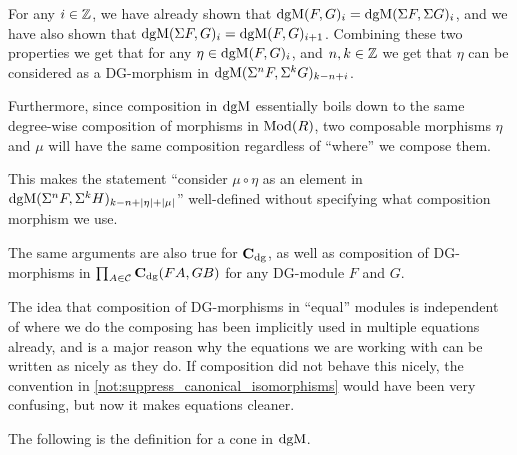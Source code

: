 \begin{remark}
    \label{rem:dgm_c_dg_super_degree_shift}
    For any \( i \in {\mathbb{Z}} \), we have already shown that \( \operatorname{dgM}(F, G)_i = \operatorname{dgM}(\Sigma F, \Sigma G)_i \), and we have also shown that \( \operatorname{dgM}(\Sigma F, G)_i = \operatorname{dgM}(F, G)_{i + 1} \). Combining these two properties we get that for any \( \eta \in \operatorname{dgM}(F, G)_i \), and \( n, k \in {\mathbb{Z}} \) we get that \( \eta \) can be considered as a DG-morphism in \( \operatorname{dgM}(\Sigma^n F, \Sigma^k G)_{k - n + i} \).

    Furthermore, since composition in \( \operatorname{dgM} \) essentially boils down to the same degree-wise composition of morphisms in \( \operatorname{Mod}(R) \), two composable morphisms \( \eta \) and \( \mu \) will have the same composition regardless of ``where'' we compose them.

    This makes the statement ``consider \( \mu \circ \eta \) as an element in \( \operatorname{dgM}(\Sigma^n F, \Sigma^k H)_{k - n + |\eta| + |\mu|} \)'' well-defined without specifying what composition morphism we use.

    The same arguments are also true for \( \operatorname{\mathbf{C}}_{\operatorname{dg}} \), as well as composition of DG-morphisms in \( \prod_{A \in {\mathcal{C}}} \operatorname{\mathbf{C}}_{\operatorname{dg}}(F A, G B) \) for any DG-module \( F \) and \( G \).
\end{remark}

The idea that composition of DG-morphisms in ``equal'' modules is independent of where we do the composing has been implicitly used in multiple equations already, and is a major reason why the equations we are working with can be written as nicely as they do. If composition did not behave this nicely, the convention in \autoref{not:suppress_canonical_isomorphisms} would have been very confusing, but now it makes equations cleaner.

The following is the definition for a cone in \( \operatorname{dgM} \).

